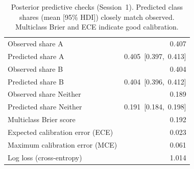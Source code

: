 \documentclass{eusset}
\begin{document}
\begin{table}[!h]
  \centering
  \begin{tabular}{l r}
    Observed share A & 0.407 \\
    Predicted share A & 0.405\ [0.397,\ 0.413] \\
    \addlinespace
    Observed share B & 0.404 \\
    Predicted share B & 0.404\ [0.396,\ 0.412] \\
    \addlinespace
    Observed share Neither & 0.189 \\
    Predicted share Neither & 0.191\ [0.184,\ 0.198] \\
    \addlinespace
    Multiclass Brier score & 0.192 \\
    Expected calibration error (ECE) & 0.023 \\
    Maximum calibration error (MCE) & 0.061 \\
    Log loss (cross-entropy) & 1.014 \\
  \end{tabular}
  \caption{Posterior predictive checks (Session~1). Predicted class shares (mean [95\% HDI]) closely match observed. Multiclass Brier and ECE indicate good calibration.}
  \label{tab:ppc_stats}
\end{table}
\end{document}
